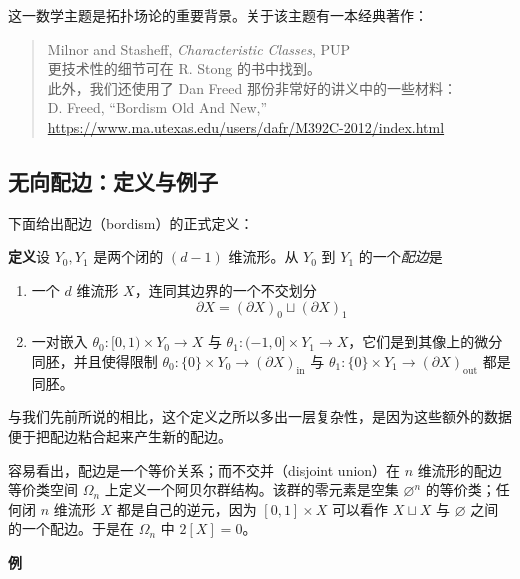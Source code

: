 这一数学主题是拓扑场论的重要背景。关于该主题有一本经典著作：
\begin{quote}
Milnor and Stasheff, \emph{Characteristic Classes}, PUP\\
更技术性的细节可在 R. Stong 的书中找到。\\
此外，我们还使用了 Dan Freed 那份非常好的讲义中的一些材料：\\
D. Freed, ``Bordism Old And New,''\\
\url{https://www.ma.utexas.edu/users/dafr/M392C-2012/index.html}
\end{quote}

\subsection{无向配边：定义与例子} %

下面给出配边（bordism）的正式定义：

\textbf{定义}\quad 设 $Y_0,Y_1$ 是两个闭的 $(d-1)$ 维流形。从 $Y_0$ 到 $Y_1$ 的一个\emph{配边}是
\begin{enumerate}
  \item 一个 $d$ 维流形 $X$，连同其边界的一个不交划分
  \begin{equation}
    \partial X=(\partial X)_0\sqcup(\partial X)_1
    \tag{L.1}
    \label{eq:L.1}
  \end{equation}
  \item 一对嵌入 $\theta_0:[0,1)\times Y_0\to X$ 与 $\theta_1:(-1,0]\times Y_1\to X$，它们是到其像上的微分同胚，并且使得限制 $\theta_0:\{0\}\times Y_0\to(\partial X)_{\mathrm{in}}$ 与 $\theta_1:\{0\}\times Y_1\to(\partial X)_{\mathrm{out}}$ 都是同胚。
\end{enumerate}

与我们先前所说的相比，这个定义之所以多出一层复杂性，是因为这些额外的数据便于把配边粘合起来产生新的配边。

容易看出，配边是一个等价关系；而不交并（disjoint union）在 $n$ 维流形的配边等价类空间 $\Omega_n$ 上定义一个阿贝尔群结构。该群的零元素是空集 $\varnothing^n$ 的等价类；任何闭 $n$ 维流形 $X$ 都是自己的逆元，因为 $[0,1]\times X$ 可以看作 $X\sqcup X$ 与 $\varnothing$ 之间的一个配边。于是在 $\Omega_n$ 中 $2[X]=0$。

\textbf{例}

